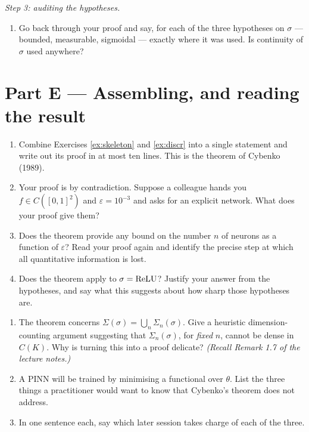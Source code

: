 \documentclass[11pt,a4paper]{article}
\begin{document}
\begin{exercise}
\medskip
\noindent\emph{Step 3: auditing the hypotheses.}
\begin{enumerate}[label=\textbf{\arabic*.}, resume]
\item Go back through your proof and say, for each of the three hypotheses on $\sigma$ --- bounded,
measurable, sigmoidal --- exactly where it was used. Is continuity of $\sigma$ used anywhere?
\end{enumerate}
\end{exercise}

\section{Part E --- Assembling, and reading the result}

\begin{exercise}\label{ex:cybenko}
\leavevmode
\begin{enumerate}[label=\textbf{\arabic*.}]
\item Combine Exercises \ref{ex:skeleton} and \ref{ex:discr} into a single statement and write out
its proof in at most ten lines. This is the theorem of Cybenko (1989).
\item Your proof is by contradiction. Suppose a colleague hands you $f \in C([0,1]^2)$ and
$\varepsilon = 10^{-3}$ and asks for an explicit network. What does your proof give them?
\item Does the theorem provide any bound on the number $n$ of neurons as a function of
$\varepsilon$? Read your proof again and identify the precise step at which all quantitative
information is lost.
\item Does the theorem apply to $\sigma = \operatorname{ReLU}$? Justify your answer from the hypotheses, and say
what this suggests about how sharp those hypotheses are.
\end{enumerate}
\end{exercise}

\begin{exercise}\label{ex:reading}
\leavevmode
\begin{enumerate}[label=\textbf{\arabic*.}]
\item The theorem concerns $\Sigma(\sigma) = \bigcup_n \Sigma_n(\sigma)$. Give a heuristic
dimension-counting argument suggesting that $\Sigma_n(\sigma)$, for \emph{fixed} $n$, cannot be
dense in $C(K)$. Why is turning this into a proof delicate? \emph{(Recall Remark 1.7 of the lecture
notes.)}
\item A PINN will be trained by minimising a functional over $\theta$. List the three things a
practitioner would want to know that Cybenko's theorem does not address.
\item In one sentence each, say which later session takes charge of each of the three.
\end{enumerate}
\end{exercise}
\end{document}
